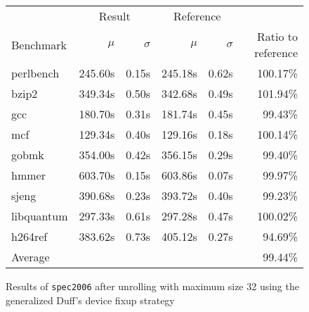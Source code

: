 \begin{figure}[th]
    \begin{center}
        \begin{tabular}{lrrrrr}
            \toprule
            & \multicolumn{2}{c}{Result} & \multicolumn{2}{c}{Reference}\\
            Benchmark & $\mu$ & $\sigma$ & $\mu$ & $\sigma$ & Ratio to reference\\
            \midrule
            perlbench & 245.60s & 0.15s & 245.18s & 0.62s & 100.17\%\\
            bzip2 & 349.34s & 0.50s & 342.68s & 0.49s & 101.94\%\\
            gcc & 180.70s & 0.31s & 181.74s & 0.45s & 99.43\%\\
            mcf & 129.34s & 0.40s & 129.16s & 0.18s & 100.14\%\\
            gobmk & 354.00s & 0.42s & 356.15s & 0.29s & 99.40\%\\
            hmmer & 603.70s & 0.15s & 603.86s & 0.07s & 99.97\%\\
            sjeng & 390.68s & 0.23s & 393.72s & 0.40s & 99.23\%\\
            libquantum & 297.33s & 0.61s & 297.28s & 0.47s & 100.02\%\\
            h264ref & 383.62s & 0.73s & 405.12s & 0.27s & 94.69\%\\
            \midrule
            Average & & & & & 99.44\%\\
            \bottomrule
        \end{tabular}
    \end{center}
    \caption{Results of \texttt{spec2006} after unrolling with maximum size 32 using the generalized Duff's device fixup strategy}
    \label{fig:eval:perf:duff:32}
\end{figure}
